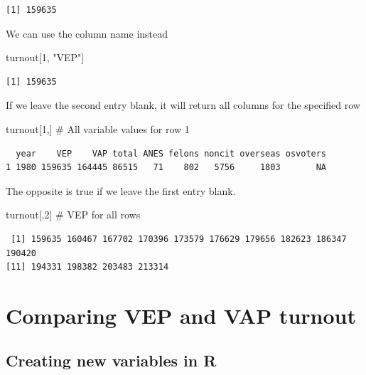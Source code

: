 \documentclass[
  letterpaper,
  DIV=11,
  numbers=noendperiod]{scrreprt}
\newenvironment{Shaded}{\begin{snugshade}}{\end{snugshade}}
\newcommand{\CommentTok}[1]{\textcolor[rgb]{0.37,0.37,0.37}{#1}}
\newcommand{\DecValTok}[1]{\textcolor[rgb]{0.68,0.00,0.00}{#1}}
\newcommand{\NormalTok}[1]{\textcolor[rgb]{0.00,0.23,0.31}{#1}}
\newcommand{\StringTok}[1]{\textcolor[rgb]{0.13,0.47,0.30}{#1}}
\begin{document}
\begin{verbatim}
[1] 159635
\end{verbatim}

We can use the column name instead

\begin{Shaded}
\begin{Highlighting}[]
\NormalTok{turnout[}\DecValTok{1}\NormalTok{, }\StringTok{"VEP"}\NormalTok{]}
\end{Highlighting}
\end{Shaded}

\begin{verbatim}
[1] 159635
\end{verbatim}

If we leave the second entry blank, it will return all columns for the
specified row

\begin{Shaded}
\begin{Highlighting}[]
\NormalTok{turnout[}\DecValTok{1}\NormalTok{,] }\CommentTok{\# All variable values for row 1}
\end{Highlighting}
\end{Shaded}

\begin{verbatim}
  year    VEP    VAP total ANES felons noncit overseas osvoters
1 1980 159635 164445 86515   71    802   5756     1803       NA
\end{verbatim}

The opposite is true if we leave the first entry blank.

\begin{Shaded}
\begin{Highlighting}[]
\NormalTok{turnout[,}\DecValTok{2}\NormalTok{] }\CommentTok{\# VEP for all rows}
\end{Highlighting}
\end{Shaded}

\begin{verbatim}
 [1] 159635 160467 167702 170396 173579 176629 179656 182623 186347 190420
[11] 194331 198382 203483 213314
\end{verbatim}

\hypertarget{comparing-vep-and-vap-turnout}{%
\section{Comparing VEP and VAP
turnout}\label{comparing-vep-and-vap-turnout}}

\hypertarget{creating-new-variables-in-r}{%
\subsection{Creating new variables in
R}\label{creating-new-variables-in-r}}
\end{document}
